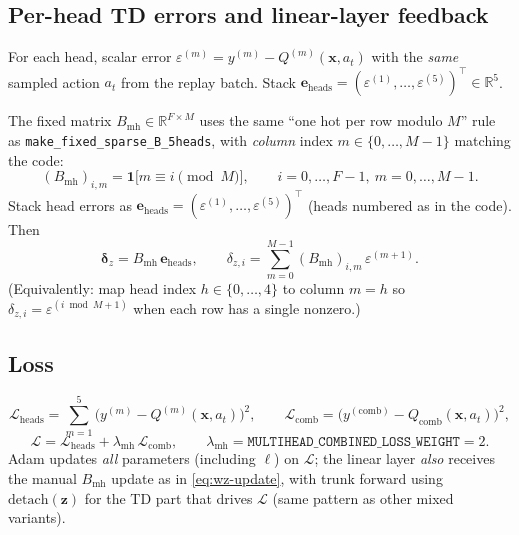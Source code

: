 \documentclass[11pt]{article}
\begin{document}
\subsection{Per-head TD errors and linear-layer feedback}
For each head, scalar error $\varepsilon^{(m)} = y^{(m)} - Q^{(m)}(\mathbf{x},a_t)$ with the \emph{same} sampled action $a_t$ from the replay batch. Stack $\mathbf{e}_{\mathrm{heads}} = (\varepsilon^{(1)},\ldots,\varepsilon^{(5)})^\top \in \mathbb{R}^5$.

The fixed matrix $B_{\mathrm{mh}} \in \mathbb{R}^{F \times M}$ uses the same ``one hot per row modulo $M$'' rule as \texttt{make\_fixed\_sparse\_B\_5heads}, with \emph{column} index $m \in \{0,\ldots,M-1\}$ matching the code:
\begin{equation}
(B_{\mathrm{mh}})_{i,m} = \mathbf{1}\bigl[m \equiv i \pmod{M}\bigr],
\qquad i=0,\ldots,F-1,\ m=0,\ldots,M-1.
\end{equation}
Stack head errors as $\mathbf{e}_{\mathrm{heads}} = (\varepsilon^{(1)},\ldots,\varepsilon^{(5)})^\top$ (heads numbered as in the code). Then
\begin{equation}
\boldsymbol{\delta}_z = B_{\mathrm{mh}}\,\mathbf{e}_{\mathrm{heads}},
\qquad
\delta_{z,i} = \sum_{m=0}^{M-1} (B_{\mathrm{mh}})_{i,m}\,\varepsilon^{(m+1)}.
\end{equation}
(Equivalently: map head index $h\in\{0,\ldots,4\}$ to column $m=h$ so $\delta_{z,i}=\varepsilon^{(i \bmod M + 1)}$ when each row has a single nonzero.)

\subsection{Loss}
\begin{equation}
\mathcal{L}_{\mathrm{heads}} = \sum_{m=1}^{5} \bigl( y^{(m)} - Q^{(m)}(\mathbf{x},a_t) \bigr)^2,
\qquad
\mathcal{L}_{\mathrm{comb}} = \bigl( y^{(\mathrm{comb})} - Q_{\mathrm{comb}}(\mathbf{x},a_t) \bigr)^2,
\end{equation}
\begin{equation}
\mathcal{L} = \mathcal{L}_{\mathrm{heads}} + \lambda_{\mathrm{mh}}\,\mathcal{L}_{\mathrm{comb}},
\qquad \lambda_{\mathrm{mh}} = \texttt{MULTIHEAD\_COMBINED\_LOSS\_WEIGHT} = 2.
\end{equation}
Adam updates \emph{all} parameters (including $\boldsymbol{\ell}$) on $\mathcal{L}$; the linear layer \emph{also} receives the manual $B_{\mathrm{mh}}$ update as in \eqref{eq:wz-update}, with trunk forward using $\mathrm{detach}(\mathbf{z})$ for the TD part that drives $\mathcal{L}$ (same pattern as other mixed variants).
\end{document}
